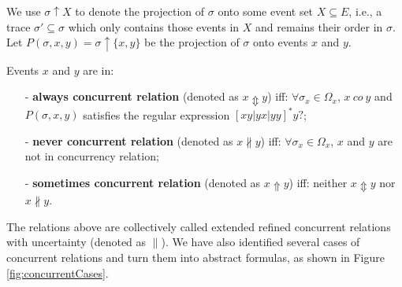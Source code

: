 \documentclass{llncs}
\begin{document}
We use $\sigma\uparrow X$ to denote the projection of $\sigma$ onto some event set $X\subseteq E$, i.e., a trace $\sigma'\subseteq\sigma$ which only contains those events in $X$ and remains their order in $\sigma$. Let $P(\sigma,x,y)=\sigma\uparrow\{x,y\}$ be the projection of $\sigma$ onto events $x$ and $y$.

\begin{definition}\label{def:extendedConcurrent}
Events $x$ and $y$ are in:
	\begin{itemize}
		\item[-] \textbf{always concurrent relation} (denoted as $x\Updownarrow y$) iff: $\forall\sigma_{x}\in\Omega_{x}$, $x~co~y$ and $P(\sigma,x,y)$ satisfies the regular expression $[xy|yx|yy]^{*}y?$;
		\item[-] \textbf{never concurrent relation} (denoted as $x\nparallel y$) iff: $\forall\sigma_{x}\in\Omega_{x}$, $x$ and $y$ are not in concurrency relation;
		\item[-] \textbf{sometimes concurrent relation} (denoted as $x\Uparrow y$) iff: neither $x\Updownarrow y$ nor $x\nparallel y$.
	\end{itemize}
\end{definition}

The relations above are collectively called extended refined concurrent relations with uncertainty (denoted as $\parallel$). We have also identified several cases of concurrent relations and turn them into abstract formulas, as shown in Figure \ref{fig:concurrentCases}.
\end{document}
